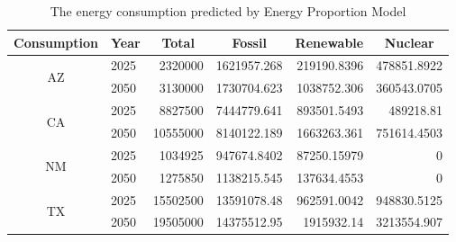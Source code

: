 \documentclass{mcmthesis}
\begin{document}
\begin{table}[htbp]
	\centering
	\caption{The energy consumption  predicted by Energy Proportion Model}
	\label{my-label}
	\begin{tabular}{|c|l|r|r|r|r|}
		\hline
		Consumption         & \multicolumn{1}{c|}{Year} & \multicolumn{1}{c|}{Total} & \multicolumn{1}{c|}{Fossil} & \multicolumn{1}{c|}{Renewable} & \multicolumn{1}{c|}{Nuclear} \\ \hline
		\multirow{2}{*}{AZ} & 2025                      & 2320000                    & 1621957.268                 & 219190.8396                    & 478851.8922                  \\ \cline{2-6} 
		& 2050                      & 3130000                    & 1730704.623                 & 1038752.306                    & 360543.0705                  \\ \hline
		\multirow{2}{*}{CA} & 2025                      & 8827500                    & 7444779.641                 & 893501.5493                    & 489218.81                    \\ \cline{2-6} 
		& 2050                      & 10555000                   & 8140122.189                 & 1663263.361                    & 751614.4503                  \\ \hline
		\multirow{2}{*}{NM} & 2025                      & 1034925                    & 947674.8402                 & 87250.15979                    & 0                            \\ \cline{2-6} 
		& 2050                      & 1275850                    & 1138215.545                 & 137634.4553                    & 0                            \\ \hline
		\multirow{2}{*}{TX} & 2025                      & 15502500                   & 13591078.48                 & 962591.0042                    & 948830.5125                  \\ \cline{2-6} 
		& 2050                      & 19505000                   & 14375512.95                 & 1915932.14                     & 3213554.907                  \\ \hline
	\end{tabular}
	\label{tab:ProPredict}%
\end{table}
\end{document}
